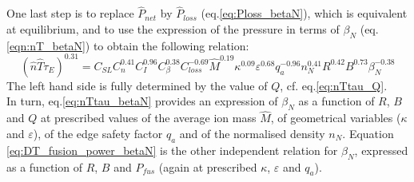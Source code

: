 One last step is to replace $\hat P_{net}$ by $\hat P_{loss}$ (eq.\ref{eq:Ploss_betaN}), which is equivalent at equilibrium, and to use the expression of the pressure in terms of $\beta_N$ (eq.\ref{eqn:nT_betaN}) to obtain the following relation:
\begin{equation}
  (\hat n\hat T\tau_E)^{0.31} = C_{SL} C_n^{0.41} C_I^{0.96} C_\beta^{0.38} 
    C_{loss}^{-0.69}
    \hat M^{0.19} \kappa^{0.09} \varepsilon^{0.68} q_a^{-0.96}
    n_N^{0.41} R^{0.42} B^{0.73} \beta_N^{-0.38}
\label{eq:nTtau_betaN}
\end{equation}
The left hand side is fully determined by the value of $Q$, cf. eq.\ref{eq:nTtau_Q}. \\

In turn, eq.\ref{eq:nTtau_betaN} provides an expression of $\beta_N$ as a function of $R$, $B$ and $Q$ at prescribed values of the average ion mass $\hat M$, of geometrical variables ($\kappa$ and $\varepsilon$), of the edge safety factor $q_a$ and of the normalised density $n_N$.
Equation \ref{eq:DT_fusion_power_betaN} is the other independent relation for $\beta_N$, expressed as a function of $R$, $B$ and $P_{fus}$ (again at prescribed $\kappa$, $\varepsilon$ and $q_a$).



